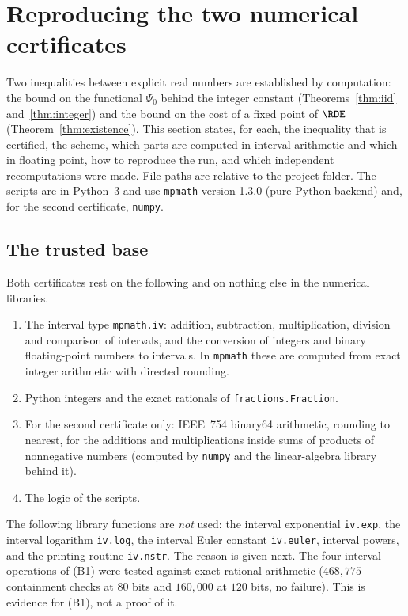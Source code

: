 \section{Reproducing the two numerical certificates}\label{sec:certificates-detail}

Two inequalities between explicit real numbers are established by computation: the bound on
the functional $\Psi_0$ behind the integer constant (Theorems~\ref{thm:iid}
and~\ref{thm:integer}) and the bound on the cost of a fixed point of $\RDE$
(Theorem~\ref{thm:existence}). This section states, for each, the inequality that is
certified, the scheme, which parts are computed in interval arithmetic and which in floating
point, how to reproduce the run, and which independent recomputations were made. File paths
are relative to the project folder. The scripts are in Python~3 and use \texttt{mpmath}
version 1.3.0 (pure-Python backend) and, for the second certificate, \texttt{numpy}.

\subsection{The trusted base}\label{sec:certificates-base}

Both certificates rest on the following and on nothing else in the numerical libraries.
\begin{enumerate}
\item[(B1)] The interval type \texttt{mpmath.iv}: addition, subtraction, multiplication,
division and comparison of intervals, and the conversion of integers and binary
floating-point numbers to intervals. In \texttt{mpmath} these are computed from exact integer
arithmetic with directed rounding.
\item[(B2)] Python integers and the exact rationals of \texttt{fractions.Fraction}.
\item[(B3)] For the second certificate only: IEEE~754 binary64 arithmetic, rounding to
nearest, for the additions and multiplications inside sums of products of nonnegative
numbers (computed by \texttt{numpy} and the linear-algebra library behind it).
\item[(B4)] The logic of the scripts.
\end{enumerate}
The following library functions are \emph{not} used: the interval exponential
\texttt{iv.exp}, the interval logarithm \texttt{iv.log}, the interval Euler constant
\texttt{iv.euler}, interval powers, and the printing routine \texttt{iv.nstr}. The reason is
given next. The four interval operations of (B1) were tested against exact rational
arithmetic ($468{,}775$ containment checks at $80$ bits and $160{,}000$ at $120$ bits, no
failure). This is evidence for (B1), not a proof of it.

